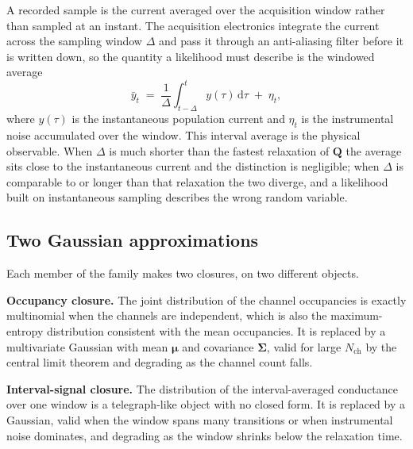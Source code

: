 A recorded sample is the current averaged over the acquisition window rather than sampled at an instant. The acquisition
electronics integrate the current across the sampling window $\Delta$ and pass it through
an anti-aliasing filter before it is written down, so the quantity a likelihood must
describe is the windowed average
\begin{equation}
  \bar{y}_t \;=\; \frac{1}{\Delta}\int_{t-\Delta}^{t} y(\tau)\,\mathrm{d}\tau \;+\; \eta_t,
  \label{eq:obs-avg}
\end{equation}
where $y(\tau)$ is the instantaneous population current and $\eta_t$ is the instrumental
noise accumulated over the window. This interval average is the physical observable. When
$\Delta$ is much shorter than the fastest relaxation of $\mathbf{Q}$ the average sits close
to the instantaneous current and the distinction is negligible; when $\Delta$ is comparable
to or longer than that relaxation the two diverge, and a likelihood built on instantaneous
sampling describes the wrong random variable.

\subsection*{Two Gaussian approximations}

Each member of the family makes two closures, on two different objects.

\begin{tcolorbox}[title={The two Gaussian approximations}, colback=gray!5, colframe=gray!55]
\textbf{Occupancy closure.} The joint distribution of the channel occupancies is exactly
multinomial when the channels are independent, which is also the maximum-entropy
distribution consistent with the mean occupancies. It is replaced by a multivariate
Gaussian with mean $\bm{\mu}$ and covariance $\bm{\Sigma}$, valid for large
$N_{\mathrm{ch}}$ by the central limit theorem and degrading as the channel count falls.

\smallskip
\textbf{Interval-signal closure.} The distribution of the interval-averaged conductance
over one window is a telegraph-like object with no closed form. It is replaced by a
Gaussian, valid when the window spans many transitions or when instrumental noise
dominates, and degrading as the window shrinks below the relaxation time.
\end{tcolorbox}

